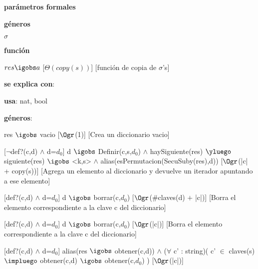 \begin{Interfaz}

	\textbf{parámetros formales}\parindent\\
	\parbox{1.7cm}{\textbf{géneros}} $\sigma$\\
	\parbox[t]{1.7cm}{\textbf{función}}\parbox[t]{\textwidth-2\parindent-1.7cm}{%
	    	{$res \igobs a$}
		[$\Theta(copy(s))$]
		[función de copia de $\sigma$'s]
	}
	
	\textbf{se explica con}: 
	
	\textbf{usa}: nat, bool
	
	\textbf{géneros}: 
	
	
	{res $\igobs$ vacio}
	[$\Ogr$(1)]
	[Crea un diccionario vacio]
	
	[$\neg$def?(c,d) $\land$ d=$d_0$]
	{d $\igobs$ Definir(c,s,$d_0$) $\land$ haySiguiente(res) $\yluego$ siguiente(res) $\igobs$ <k,s> $\land$ alias(esPermutacion(SecuSuby(res),d))}
	[$\Ogr$(|c| + copy(s))]
	[Agrega un elemento al diccionario y devuelve un iterador apuntando a ese elemento]	
	
	[def?(c,d) $\land$ d=$d_0$]
	{d $\igobs$ borrar(c,$d_0$)}
	[$\Ogr$($\#$claves(d) $+$ |c|)]
	[Borra el elemento correspondiente a la clave c del diccionario]
	
	[def?(c,d) $\land$ d=$d_0$]
	{d $\igobs$ borrar(c,$d_0$)}
	[$\Ogr$(|c|)]
	[Borra el elemento correspondiente a la clave c del diccionario]
	
	[def?(c,d) $\land$ d=$d_0$]
	{alias(res $\igobs$ obtener(c,d)) $\land$ ($\forall$ c' : string)( c' $\in$ claves(s) $\impluego$ obtener(c,d) $\igobs$ obtener(c,$d_0$) )}
	[$\Ogr$(|c|)]
	
\end{Interfaz}

